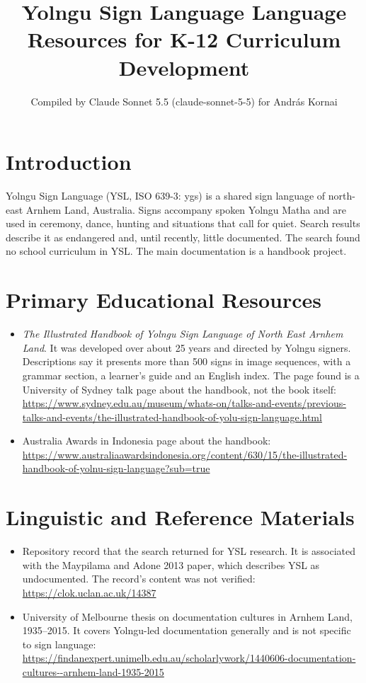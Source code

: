 \documentclass[12pt]{article}
\title{Yolngu Sign Language Language Resources for K-12 Curriculum Development}
\author{Compiled by Claude Sonnet 5.5 (claude-sonnet-5-5) for Andr\'as Kornai}
\date{}
\begin{document}
\maketitle

\section{Introduction}
Yolngu Sign Language (YSL, ISO 639-3: ygs) is a shared sign language of north-east Arnhem Land, Australia. Signs accompany spoken Yolngu Matha and are used in ceremony, dance, hunting and situations that call for quiet. Search results describe it as endangered and, until recently, little documented. The search found no school curriculum in YSL. The main documentation is a handbook project.

\section{Primary Educational Resources}
\begin{itemize}
\item \emph{The Illustrated Handbook of Yolngu Sign Language of North East Arnhem Land}. It was developed over about 25 years and directed by Yolngu signers. Descriptions say it presents more than 500 signs in image sequences, with a grammar section, a learner's guide and an English index. The page found is a University of Sydney talk page about the handbook, not the book itself: \url{https://www.sydney.edu.au/museum/whats-on/talks-and-events/previous-talks-and-events/the-illustrated-handbook-of-yolu-sign-language.html}
\item Australia Awards in Indonesia page about the handbook: \url{https://www.australiaawardsindonesia.org/content/630/15/the-illustrated-handbook-of-yolnu-sign-language?sub=true}
\end{itemize}

\section{Linguistic and Reference Materials}
\begin{itemize}
\item Repository record that the search returned for YSL research. It is associated with the Maypilama and Adone 2013 paper, which describes YSL as undocumented. The record's content was not verified: \url{https://clok.uclan.ac.uk/14387}
\item University of Melbourne thesis on documentation cultures in Arnhem Land, 1935--2015. It covers Yolngu-led documentation generally and is not specific to sign language: \url{https://findanexpert.unimelb.edu.au/scholarlywork/1440606-documentation-cultures--arnhem-land-1935-2015}
\end{itemize}
\end{document}
